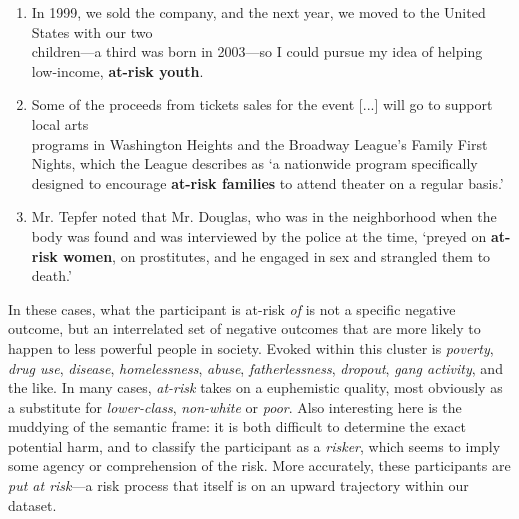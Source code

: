 \begin{enumerate}    [before=\color{black}\ttfamily] \setlength\itemsep{0em} \small
\item In 1999, we sold the company, and the next year, we moved to the United States with our two \\ children---a third was born in 2003---so I could pursue my idea of helping low-income, \textbf{at-risk youth}.
\item Some of the proceeds from tickets sales for the event {[}...{]} will go to support local arts \\ programs in Washington Heights and the Broadway League's Family First Nights, which the League describes as `a nationwide program specifically designed to encourage \textbf{at-risk families} to attend theater on a regular basis.'
\item Mr. Tepfer noted that Mr. Douglas, who was in the neighborhood when the body was found and was interviewed by the police at the time, `preyed on \textbf{at-risk women}, on prostitutes, and he engaged in sex and strangled them to death.'
\end{enumerate}
% 
In these cases, what the participant is at-risk \emph{of} is not a specific negative outcome, but an interrelated set of negative outcomes that are more likely to happen to less powerful people in society. Evoked within this cluster is \emph{poverty}, \emph{drug use}, \emph{disease}, \emph{homelessness}, \emph{abuse}, \emph{fatherlessness}, \emph{dropout}, \emph{gang activity}, and the like. In many cases, \emph{at-risk} takes on a euphemistic quality, most obviously as a substitute for \emph{lower-class}, \emph{non-white} or \emph{poor}. Also interesting here is the muddying of the semantic frame: it is both difficult to determine the exact potential harm, and to classify the participant as a \emph{risker}, which seems to imply some agency or comprehension of the risk. More accurately, these participants are \emph{put at risk}---a risk process that itself is on an upward trajectory within our dataset.~ 

